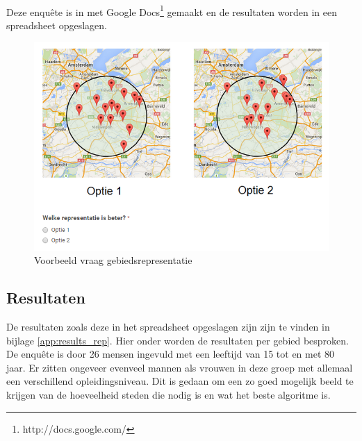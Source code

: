 \documentclass[twoside,openright]{uva-bachelor-thesis}
\begin{document}
			\\[0.5cm]
			Deze enqu\^ete is in met Google Docs\footnote{http://docs.google.com/} gemaakt en de resultaten worden in een spreadsheet opgeslagen.
			\begin{figure}[!htb]
				\centering
				\includegraphics[scale=0.8]{./img/algo.png}
				\caption{Voorbeeld vraag gebiedsrepresentatie}
				\label{fig:algo}
			\end{figure}	
		\newpage		
		\subsection{Resultaten}
			De resultaten zoals deze in het spreadsheet opgeslagen zijn zijn te vinden in bijlage \ref{app:results_rep}. Hier onder worden de resultaten per gebied besproken. De enqu\^ete is door 26 mensen ingevuld met een leeftijd van 15 tot en met 80 jaar. Er zitten ongeveer evenveel mannen als vrouwen in deze groep met allemaal een verschillend opleidingsniveau. Dit is gedaan om een zo goed mogelijk beeld te krijgen van de hoeveelheid steden die nodig is en wat het beste algoritme is.
\end{document}
